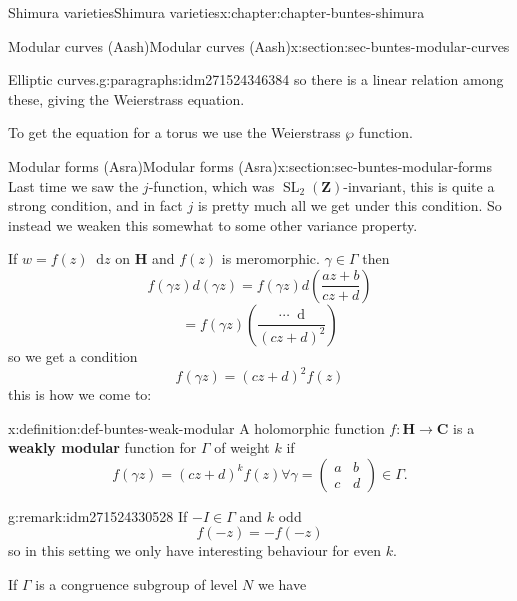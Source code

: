 \documentclass[oneside,10pt,]{book}
\newcommand{\terminology}[1]{\textbf{#1}}
\numberwithin{equation}{section}
\newcommand{\diff}{\mathop{}\!\mathrm{d}}
\newcommand{\ZZ}{\mathbf{Z}}
\newcommand{\CC}{\mathbf{C}}
\newcommand{\HH}{\mathbf{H}}
\DeclareMathOperator{\SL}{SL}
\newcommand{\amp}{&}
\begin{document}
\begin{chapterptx}{Shimura varieties}{}{Shimura varieties}{}{}{x:chapter:chapter-buntes-shimura}
\begin{sectionptx}{Modular curves (Aash)}{}{Modular curves (Aash)}{}{}{x:section:sec-buntes-modular-curves}
\begin{paragraphs}{Elliptic curves.}{g:paragraphs:idm271524346384}
so there is a linear relation among these, giving the Weierstrass equation.%
\par
To get the equation for a torus we use the Weierstrass \(\wp\) function.%
\end{paragraphs}%
\end{sectionptx}
%
%
\typeout{************************************************}
\typeout{************************************************}
%
\begin{sectionptx}{Modular forms (Asra)}{}{Modular forms (Asra)}{}{}{x:section:sec-buntes-modular-forms}
Last time we saw the \(j\)-function, which was \(\SL_2(\ZZ)\)-invariant, this is quite a strong condition, and in fact \(j\) is pretty much all we get under this condition. So instead we weaken this somewhat to some other variance property.%
\par
If \(w = f(z) \diff z\) on \(\HH\) and \(f(z)\) is meromorphic. \(\gamma \in \Gamma\) then%
\begin{equation*}
f(\gamma z) d(\gamma z) = f(\gamma z) d\left( \frac{az+b}{cz+d} \right)
\end{equation*}
%
\begin{equation*}
= f(\gamma z) \left( \frac{\cdots \diff }{(cz+d)^2} \right)
\end{equation*}
so we get a condition%
\begin{equation*}
f(\gamma z) = (cz+d)^2 f(z)
\end{equation*}
this is how we come to:%
\begin{definition}{}{x:definition:def-buntes-weak-modular}%
A holomorphic function \(f\colon \HH \to \CC\) is a \terminology{weakly modular} function for \(\Gamma\) of weight \(k\) if%
\begin{equation*}
f(\gamma z) = (cz+d)^k f(z) \forall \gamma  = \begin{pmatrix} a\amp b \\ c \amp d    \end{pmatrix} \in \Gamma\text{.}
\end{equation*}
%
\end{definition}
\begin{remark}{}{g:remark:idm271524330528}%
If \(-I \in \Gamma\) and \(k\) odd%
\begin{equation*}
f(-z)  = - f(-z)
\end{equation*}
so in this setting we only have interesting behaviour for even \(k\).%
\par
If \(\Gamma\) is a congruence subgroup of level \(N\) we have%

\end{remark}
\end{sectionptx}
\end{chapterptx}
\end{document}
